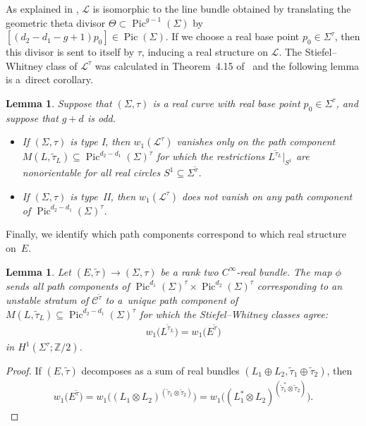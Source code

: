 \documentclass[10pt,a4paper]{amsart}
\numberwithin{equation}{section}
\newtheorem{Lemma}[Theorem]{Lemma}
\begin{document}
As explained in \cite[Section~1]{OT}, ${\mathcal L}$ is isomorphic to the line bundle obtained by translating the geometric theta divisor $\Theta \subset \operatorname{Pic}^{g-1}(\Sigma)$ by $[(d_2-d_1-g+1)p_0] \in \operatorname{Pic}(\Sigma)$. If we choose a real base point $p_0 \in \Sigma^{\tau}$, then this divisor is sent to itself by $\tau$, inducing a real structure on ${\mathcal L}$. The Stiefel--Whitney class of ${\mathcal L}^{\tau}$ was calculated in Theorem~4.15 of~\cite{OT} and the following lemma is a~direct corollary.

\begin{Lemma}\label{orientability}
Suppose that $(\Sigma,\tau)$ is a real curve with real base point $p_0 \in \Sigma^{\tau}$, and suppose that $g +d$ is odd.
\begin{itemize}\itemsep=0pt
\item[$(i)$]If $(\Sigma,\tau)$ is type I, then $w_1( {\mathcal L}^{\tau})$ vanishes only on the path component $M(L, \tilde{\tau}_L) {\subseteq}\! \operatorname{Pic}^{d_2{-}d_1}\!(\Sigma)^{\tau}$ for which the restrictions $L^{\tilde{\tau}_L}|_{S^1}$ are nonorientable for all real circles $S^1 \subseteq \Sigma^{\tilde{\tau}}$.	
\item[$(ii)$] If $(\Sigma,\tau)$ is type~II, then $w_1( {\mathcal L} ^{\tau})$ does not vanish on any path component of $\operatorname{Pic}^{d_2-d_1}(\Sigma)^{\tau}$.
\end{itemize}
\end{Lemma}

Finally, we identify which path components correspond to which real structure on~$E$.

\begin{Lemma}\label{orientSWstuff}
Let $(E,\tilde{\tau}) \rightarrow (\Sigma,\tau)$ be a rank two $C^{\infty}$-real bundle. The map $\phi$ sends all path components of $\operatorname{Pic}^{d_1}(\Sigma)^{\tau} \times \operatorname{Pic}^{d_2}(\Sigma)^{\tau}$ corresponding to an unstable stratum of ${\mathcal C}^{\tilde{\tau}}$ to a~unique path component of $M(L, \tilde{\tau}_L) \subseteq \operatorname{Pic}^{d_2-d_1}(\Sigma)^{\tau}$ for which the Stiefel--Whitney classes agree:{\samepage \begin{gather*}w_1\big( L^{\tilde{\tau}_{L}}\big) = w_1\big(E^{\tilde{\tau}}\big)\end{gather*}
in $H^1(\Sigma^{\tau}; {\mathbb Z}/2)$.}
\end{Lemma}

\begin{proof}
If $(E,\tilde{\tau})$ decomposes as a sum of real bundles $(L_1 \oplus L_2, \tilde{\tau}_1 \oplus \tilde{\tau}_2)$, then
 \begin{gather*}
 w_1\big(E^{\tilde{\tau}} \big) = w_1\big((L_1 \otimes L_2)^{(\tilde{\tau}_1 \otimes \tilde{\tau}_2)}\big) = w_1\big((L_1^* \otimes L_2)^{(\tilde{\tau}_1^* \otimes \tilde{\tau}_2)}\big).\tag*{\qed}
 \end{gather*}
\renewcommand{\qed}{}
\end{proof}
\end{document}
